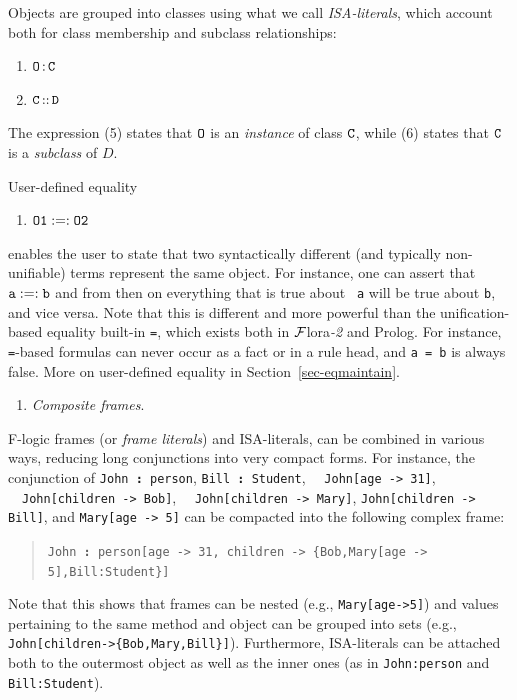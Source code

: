 \documentclass[11pt]{article}
\newcommand{\FLORA}{{\mbox{\sc ${\cal F}${lora}\rm\emph{-2}}}\xspace}
\newcommand{\FLSYSTEM}{\FLORA}
\newcommand{\isa}{\,{\bf{:}}\,}
\newcommand{\subcl}{\,{\bf{::}}\,}
\newcommand{\mvd}{{\mbox{\tt \,->\,}}}  %
\begin{document}
\begin{itemize}
  \medskip

  Objects are grouped into classes using what we call
  \emph{ISA-literals}, which account both for class membership and subclass
  relationships:

  \medskip

  \begin{enumerate}
  \item[5.] $\tt O\isa C$
  \item[6.] \label{eq-subclass} $\tt C\subcl D$
  \end{enumerate}

  The expression (5) states that $\tt O$ is an \emph{instance} of class $\tt C$,
  while (6) states that $\tt C$ is a \emph{subclass} of $D$.

  User-defined equality
  \begin{enumerate}
    \item[7.] $\tt O1 :=: O2$
  \end{enumerate}
  enables the user to state that two syntactically different (and typically
  non-unifiable) terms represent the same object. For instance, one can
  assert that $\tt a :=: b$ and from then on everything that is true about {\tt
  a}  will be true about {\tt b}, and vice versa. Note that this is
  different and more powerful than the unification-based equality built-in
  {\tt =}, which exists both in \FLSYSTEM and Prolog. For instance, {\tt
  =}-based formulas can never occur as a fact or in a rule head, and {\tt a =
  b} is always false.  More on user-defined equality in
  Section~\ref{sec-eqmaintain}.

  \begin{enumerate}
   \item[8.] \emph{Composite frames}.  
  \end{enumerate}
  F-logic frames (or \emph{frame literals}) and
  ISA-literals, can be combined in various ways, reducing long conjunctions
  into very compact forms.
  For instance, the conjunction of
  {\tt John{\isa}person}, \texttt{Bill{\isa}Student},~~ {\tt John[age{\mvd}31]},
  ~~{\tt John[children\mvd Bob]},
  ~~\texttt{John[children\mvd Mary]},
  \texttt{John[children\mvd Bill]}, and \texttt{Mary[age\mvd 5]}  
  can be compacted into the following complex frame:
  \begin{quote}
    {\tt John{\isa}person[age{\mvd}31, children\mvd\{Bob,Mary[age\mvd
      5],Bill:Student\}]} 
  \end{quote}
  Note that this shows that frames can be nested (e.g.,
  \texttt{Mary[age->5]}) and values pertaining to
  the same method and object
  can be grouped into sets (e.g.,
  \texttt{John[children->\{Bob,Mary,Bill\}]}). Furthermore, ISA-literals
  can be attached both to the outermost object as well as the inner ones
  (as in \texttt{John:person} and \texttt{Bill:Student}).  


\end{itemize}
\end{document}
